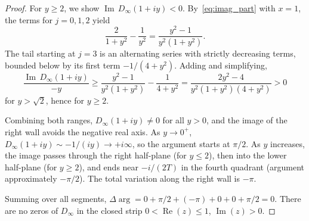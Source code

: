 \documentclass[10pt,a4paper]{amsart}
\newcommand{\Imag}{\operatorname{Im}}
\newcommand{\Real}{\operatorname{Re}}
\begin{document}
\begin{proof}
For $y \geq 2$, we show $\Imag\, D_\infty(1+iy) < 0$. By~\eqref{eq:imag_part} with $x = 1$, the terms for $j = 0,1,2$ yield
$$
\frac{2}{1+y^2} - \frac{1}{y^2} = \frac{y^2-1}{y^2(1+y^2)}.
$$
The tail starting at $j = 3$ is an alternating series with strictly decreasing terms, bounded below by its first term $-1/(4+y^2)$. Adding and simplifying,
$$
\frac{\Imag\, D_\infty(1+iy)}{-y} \geq \frac{y^2-1}{y^2(1+y^2)} - \frac{1}{4+y^2} = \frac{2y^2-4}{y^2(1+y^2)(4+y^2)} > 0
$$
for $y > \sqrt{2}$, hence for $y \geq 2$.

Combining both ranges, $D_\infty(1+iy) \neq 0$ for all $y > 0$, and the image of the right wall avoids the negative real axis. As $y \to 0^+$, $D_\infty(1+iy) \sim -1/(iy) \to +i\infty$, so the argument starts at $\pi/2$. As $y$ increases, the image passes through the right half-plane (for $y \leq 2$), then into the lower half-plane (for $y \geq 2$), and ends near $-i/(2T)$ in the fourth quadrant (argument approximately $-\pi/2$). The total variation along the right wall is $-\pi$.

Summing over all segments, $\Delta\arg = 0 + \pi/2 + (-\pi) + 0 + 0 + \pi/2 = 0$. There are no zeros of $D_\infty$ in the closed strip $0 < \Real(z) \leq 1$, $\Imag(z) > 0$.
\end{proof}
\end{document}
